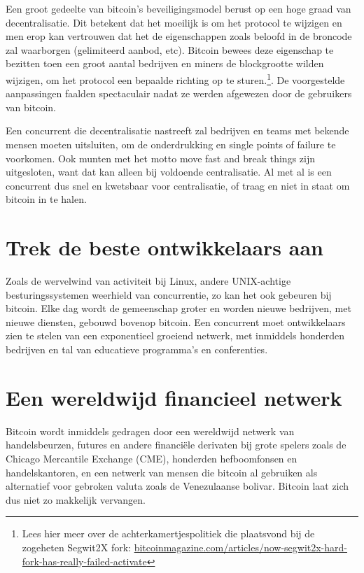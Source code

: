 \documentclass[smalldemyvopaper,11pt,twoside,onecolumn,openright,extrafontsizes]{memoir}
\begin{document}
Een groot gedeelte van bitcoin's beveiligingsmodel berust op een hoge graad van decentralisatie. Dit betekent dat het moeilijk is om het protocol te wijzigen en men erop kan vertrouwen dat het de eigenschappen zoals beloofd in de broncode zal waarborgen (gelimiteerd aanbod, etc). Bitcoin bewees deze eigenschap te bezitten toen een groot aantal bedrijven en miners de blockgrootte wilden wijzigen, om het protocol een bepaalde richting op te sturen.\footnote{Lees hier meer over de achterkamertjespolitiek die plaatsvond bij de zogeheten Segwit2X fork:  \href{https://bitcoinmagazine.com/articles/now-segwit2x-hard-fork-has-really-failed-activate}{bitcoinmagazine.com/articles/now-segwit2x-hard-fork-has-really-failed-activate}}. De voorgestelde aanpassingen faalden spectaculair nadat ze werden afgewezen door de gebruikers van bitcoin. 

Een concurrent die decentralisatie nastreeft zal bedrijven en teams met bekende mensen moeten uitsluiten, om de onderdrukking en \textquotedbl{}single points of failure\textquotedbl{} te voorkomen. Ook munten met het motto \textquotedbl{}move fast and break things\textquotedbl{} zijn uitgesloten, want dat kan alleen bij voldoende centralisatie. Al met al is een concurrent dus snel en kwetsbaar voor centralisatie, of traag en niet in staat om bitcoin in te halen.

\section{Trek de beste ontwikkelaars aan}

Zoals de wervelwind van activiteit bij Linux, andere UNIX-achtige besturingssystemen weerhield van concurrentie, zo kan het ook gebeuren bij bitcoin. Elke dag wordt de gemeenschap groter en worden nieuwe bedrijven, met nieuwe diensten, gebouwd bovenop bitcoin. Een concurrent moet ontwikkelaars zien te stelen van een exponentieel groeiend netwerk, met inmiddels honderden bedrijven en tal van educatieve programma's en conferenties.  

\section{Een wereldwijd financieel netwerk}

Bitcoin wordt inmiddels gedragen door een wereldwijd netwerk van handelsbeurzen, futures en andere financiële derivaten bij grote spelers zoals de Chicago Mercantile Exchange (CME), honderden hefboomfonsen en handelskantoren, en een netwerk van mensen die bitcoin al gebruiken als alternatief voor gebroken valuta zoals de Venezulaanse bolivar. Bitcoin laat zich dus niet zo makkelijk vervangen.
\end{document}
